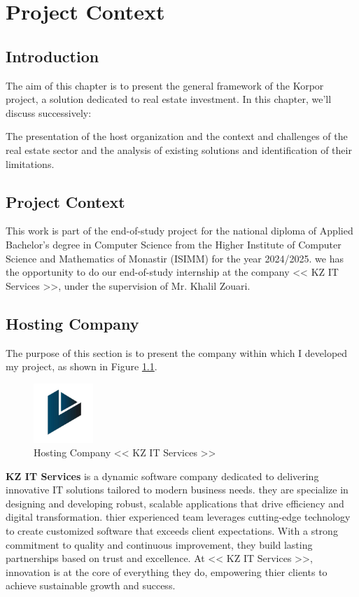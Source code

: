 \chapter{Project Context}

\section*{Introduction}

The aim of this chapter is to present the general framework of the Korpor project, a solution dedicated to real estate investment. In this chapter, we'll discuss successively:

The presentation of the host organization and the context and challenges of the real estate sector and the analysis of existing solutions and identification of their limitations.


\section{Project Context}

This work is part of the end-of-study project for the national diploma of Applied Bachelor's degree in Computer Science from the Higher Institute of Computer Science and Mathematics of Monastir (ISIMM) for the year 2024/2025. we has the opportunity to do our end-of-study internship at the company
<< KZ IT Services >>, under the supervision of Mr. Khalil Zouari.

\section{Hosting Company}

The purpose of this section is to present the company within which I developed my project, as shown in Figure \ref{fig:hosting-company}.

\begin{figure}[htbp]
    \centering
    \includegraphics[width=0.2\textwidth]{images/company-logo.png}
    \caption{Hosting Company << KZ IT Services >>}
    \label{fig:hosting-company}
\end{figure}

\textbf{\textcolor{primary}{KZ IT Services}} is a dynamic software company dedicated to delivering innovative IT solutions tailored to modern business needs. they are specialize in designing and developing robust, scalable applications that drive efficiency and digital transformation. thier experienced team leverages cutting-edge technology to create customized software that exceeds client expectations. With a strong commitment to quality and continuous improvement, they build lasting partnerships based on trust and excellence. At << KZ IT Services >>, innovation is at the core of everything they do, empowering thier clients to achieve sustainable growth and success.

